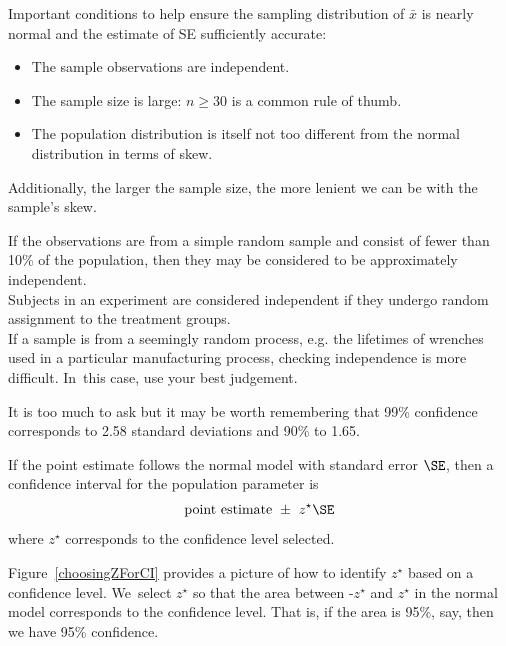 \begin{termBox}{
Important conditions to help ensure the sampling distribution of $\bar{x}$ is nearly normal and the estimate of SE sufficiently accurate:
\begin{itemize}
\setlength{\itemsep}{0mm}
\item The sample observations are independent.
\item The sample size is large: $n\geq30$ is a common rule of thumb.
\item The population distribution is itself not too different from the normal distribution in terms of skew.
\end{itemize}
Additionally, the larger the sample size, the more lenient we can be with the sample's skew.}
\end{termBox}

\begin{tipBox}{
If the observations are from a simple random sample and consist of fewer than 10\% of the population, then they may be considered to be approximately independent.\\[2mm]
Subjects in an experiment are considered independent if they undergo random assignment to the treatment groups. \\[2mm]
If a sample is from a seemingly random process, e.g. the lifetimes of wrenches used in a particular manufacturing process, checking independence is more difficult. In~this case, use your best judgement.}
\end{tipBox}


It is too much to ask but it may be worth remembering that 99\% confidence corresponds to 2.58 standard deviations and 90\% to 1.65.


\begin{termBox}{
If the point estimate follows the normal model with standard error $\SE$, then a confidence interval for the population parameter is
\begin{eqnarray*}
\text{point estimate}\ \pm\ z^{\star} \SE
\end{eqnarray*}
where $z^{\star}$ corresponds to the confidence level selected.}
\end{termBox}

Figure~\ref{choosingZForCI} provides a picture of how to identify $z^{\star}$ based on a confidence level. We~select $z^{\star}$ so that the area between -$z^{\star}$ and $z^{\star}$ in the normal model corresponds to the confidence level. That is, if the area is 95\%, say, then we have 95\% confidence.

